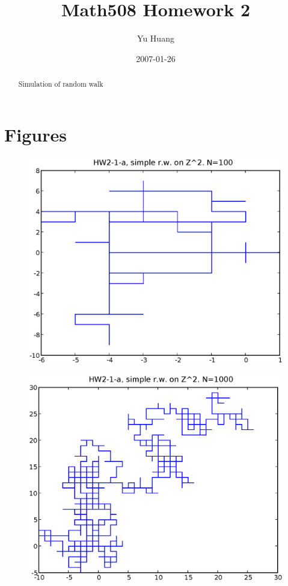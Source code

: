 \documentclass[a4paper,10pt]{article}
\title{Math508 Homework 2}
\author{Yu Huang}
\date{2007-01-26}
\begin{document}
\maketitle

\begin{abstract}
Simulation of random walk
\end{abstract}

\section{Figures}
\begin{figure}[h]
\includegraphics[width=1\textwidth]{hw2_1_a_N100.eps}
\caption{}
\end{figure}
\begin{figure}[p]
\includegraphics[width=1\textwidth]{hw2_1_a_N1000.eps}
\caption{}
\end{figure}
\end{document}
